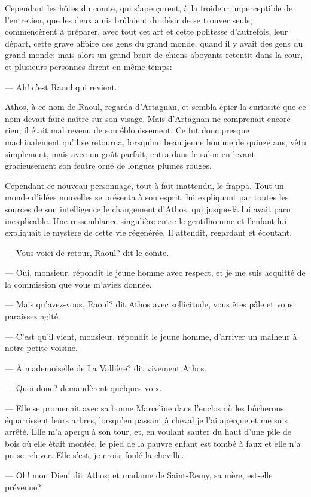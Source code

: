 Cependant les hôtes du comte, qui s'aperçurent, à la froideur imperceptible de l'entretien, que les deux amis brûlaient du désir de se trouver seuls, commencèrent à préparer, avec tout cet art et cette politesse d'autrefois, leur départ, cette grave affaire des gens du grand monde, quand il y avait des gens du grand monde; mais alors un grand bruit de chiens aboyants retentit dans la cour, et plusieurs personnes dirent en même temps:

— Ah! c'est Raoul qui revient.

Athos, à ce nom de Raoul, regarda d'Artagnan, et sembla épier la curiosité que ce nom devait faire naître sur son visage. Mais d'Artagnan ne comprenait encore rien, il était mal revenu de son éblouissement. Ce fut donc presque machinalement qu'il se retourna, lorsqu'un beau jeune homme de quinze ans, vêtu simplement, mais avec un goût parfait, entra dans le salon en levant gracieusement son feutre orné de longues plumes rouges.

Cependant ce nouveau personnage, tout à fait inattendu, le frappa. Tout un monde d'idées nouvelles se présenta à son esprit, lui expliquant par toutes les sources de son intelligence le changement d'Athos, qui jusque-là lui avait paru inexplicable. Une ressemblance singulière entre le gentilhomme et l'enfant lui expliquait le mystère de cette vie régénérée. Il attendit, regardant et écoutant.

— Vous voici de retour, Raoul? dit le comte.

— Oui, monsieur, répondit le jeune homme avec respect, et je me suis acquitté de la commission que vous m'aviez donnée.

— Mais qu'avez-vous, Raoul? dit Athos avec sollicitude, vous êtes pâle et vous paraissez agité.

— C'est qu'il vient, monsieur, répondit le jeune homme, d'arriver un malheur à notre petite voisine.

— À mademoiselle de La Vallière? dit vivement Athos.

— Quoi donc? demandèrent quelques voix.

— Elle se promenait avec sa bonne Marceline dans l'enclos où les bûcherons équarrissent leurs arbres, lorsqu'en passant à cheval je l'ai aperçue et me suis arrêté. Elle m'a aperçu à son tour, et, en voulant sauter du haut d'une pile de bois où elle était montée, le pied de la pauvre enfant est tombé à faux et elle n'a pu se relever. Elle s'est, je crois, foulé la cheville.

— Oh! mon Dieu! dit Athos; et madame de Saint-Remy, sa mère, est-elle prévenue?

